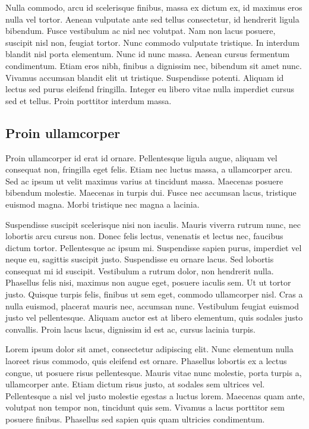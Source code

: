 \documentclass[twoside,openright,a4paper,11pt,french]{article}
\begin{document}
Nulla commodo, arcu id scelerisque finibus, massa ex dictum ex, id maximus eros nulla vel tortor. Aenean vulputate ante sed tellus consectetur, id hendrerit ligula bibendum. Fusce vestibulum ac nisl nec volutpat. Nam non lacus posuere, suscipit nisl non, feugiat tortor. Nunc commodo vulputate tristique. In interdum blandit nisl porta elementum. Nunc id nunc massa. Aenean cursus fermentum condimentum. Etiam eros nibh, finibus a dignissim nec, bibendum sit amet nunc. Vivamus accumsan blandit elit ut tristique. Suspendisse potenti. Aliquam id lectus sed purus eleifend fringilla. Integer eu libero vitae nulla imperdiet cursus sed et tellus. Proin porttitor interdum massa.

\subsection{Proin ullamcorper}

Proin ullamcorper id erat id ornare. Pellentesque ligula augue, aliquam vel consequat non, fringilla eget felis. Etiam nec luctus massa, a ullamcorper arcu. Sed ac ipsum ut velit maximus varius at tincidunt massa. Maecenas posuere bibendum molestie. Maecenas in turpis dui. Fusce nec accumsan lacus, tristique euismod magna. Morbi tristique nec magna a lacinia.

Suspendisse suscipit scelerisque nisi non iaculis. Mauris viverra rutrum nunc, nec lobortis arcu cursus non. Donec felis lectus, venenatis et lectus nec, faucibus dictum tortor. Pellentesque ac ipsum mi. Suspendisse sapien purus, imperdiet vel neque eu, sagittis suscipit justo. Suspendisse eu ornare lacus. Sed lobortis consequat mi id suscipit. Vestibulum a rutrum dolor, non hendrerit nulla. Phasellus felis nisi, maximus non augue eget, posuere iaculis sem. Ut ut tortor justo. Quisque turpis felis, finibus ut sem eget, commodo ullamcorper nisl. Cras a nulla euismod, placerat mauris nec, accumsan nunc. Vestibulum feugiat euismod justo vel pellentesque. Aliquam auctor est at libero elementum, quis sodales justo convallis. Proin lacus lacus, dignissim id est ac, cursus lacinia turpis.

Lorem ipsum dolor sit amet, consectetur adipiscing elit. Nunc elementum nulla laoreet risus commodo, quis eleifend est ornare. Phasellus lobortis ex a lectus congue, ut posuere risus pellentesque. Mauris vitae nunc molestie, porta turpis a, ullamcorper ante. Etiam dictum risus justo, at sodales sem ultrices vel. Pellentesque a nisl vel justo molestie egestas a luctus lorem. Maecenas quam ante, volutpat non tempor non, tincidunt quis sem. Vivamus a lacus porttitor sem posuere finibus. Phasellus sed sapien quis quam ultricies condimentum.
\end{document}
